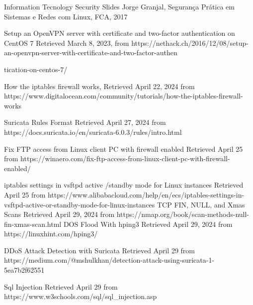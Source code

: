 \documentclass{article}
\begin{document}
\begin{thebibliography}{}
Information Tecnology Security Slides
Jorge Granjal, Segurança Prática em Sistemas e Redes com Linux, FCA, 2017

Setup an OpenVPN server with certificate and two-factor authentication on CentOS 7 Retrieved March 8, 2023, from https://nethack.ch/2016/12/08/setup-an-openvpn-server-with-certificate-and-two-factor-authen\par tication-on-centos-7/

How the iptables firewall works, Retrieved April 22, 2024 from https://www.digitalocean.com/community/tutorials/how-the-iptables-firewall-works

 Suricata Rules Format Retrieved April 27, 2024 from 
https://docs.suricata.io/en/suricata-6.0.3/rules/intro.html

 Fix FTP access from Linux client PC with firewall enabled Retrieved April 25 from https://winaero.com/fix-ftp-access-from-linux-client-pc-with-firewall-enabled/

 iptables settings in vsftpd active /standby mode for Linux instances Retrieved April 25 from https://www.alibabacloud.com/help/en/ecs/iptables-settings-in-vsftpd-active-or-standby-mode-for-linux-instances
 TCP FIN, NULL, and Xmas Scans Retrieved April 29, 2024 from
https://nmap.org/book/scan-methods-null-fin-xmas-scan.html
 DOS Flood With hping3 Retrieved April 29, 2024 from
https://linuxhint.com/hping3/


 DDoS Attack Detection with Suricata Retrieved April 29 from https://medium.com/@mshulkhan/detection-attack-using-suricata-1-5ea7b2f62551

 Sql Injection Retrieved April 29 from  https://www.w3schools.com/sql/sql\_injection.asp


\end{thebibliography}
\end{document}

